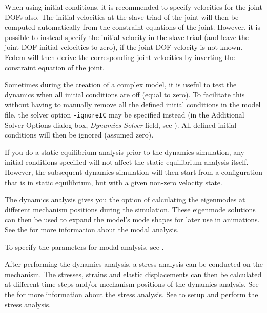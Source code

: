 
When using initial conditions, it is recommended to specify velocities
for the joint DOFs also. The initial velocities at the slave triad of
the joint will then be computed automatically from the constraint
equations of the joint. However, it is possible to instead specify the
initial velocity in the slave triad (and leave the joint DOF initial
velocities to zero), if the joint DOF velocity is not known.
Fedem will then derive the corresponding
joint velocities by inverting the constraint equation of the joint.

Sometimes during the creation of a complex model, it is useful to test
the dynamics when all initial conditions are off (equal to zero).
To facilitate this without having to manually remove all the defined
initial conditions in the model file, the solver option {\tt-ignoreIC}
may be specified instead (in the Additional Solver Options dialog box,
{\sl Dynamics Solver} field,
see ).
All defined initial conditions will then be ignored (assumed zero).

If you do a static equilibrium analysis prior to the dynamics simulation, any
initial conditions specified will not affect the static equilibrium analysis
itself. However, the subsequent dynamics simulation will then start from
a configuration that is in static equilibrium,
but with a given non-zero velocity state.


The dynamics analysis gives you the option of calculating the eigenmodes
at different mechanism positions during the simulation.
These eigenmode solutions can then be used to expand the model's mode shapes
for later use in animations.
See the 
for more information about the modal analysis.

To specify the parameters for modal analysis, see
.



After performing the dynamics analysis,
a stress analysis can be conducted on the mechanism.
The stresses, strains and elastic displacements can then be calculated at
different time steps and/or mechanism positions of the dynamics analysis.
See the 
for more information about the stress analysis.
See 
to setup and perform the stress analysis.

